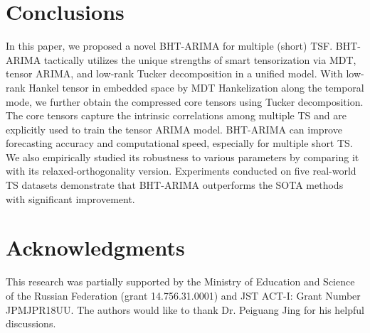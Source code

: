 \documentclass[letterpaper]{article} %
\numberwithin{theorem}{section}
\begin{document}
\section{Conclusions}



In this paper, we  proposed a novel  BHT-ARIMA for multiple (short) TSF. BHT-ARIMA tactically utilizes the unique strengths of  smart tensorization via MDT, tensor ARIMA, and low-rank Tucker 
decomposition in a unified model.  With low-rank Hankel tensor in embedded space by MDT Hankelization along  the temporal mode, we further obtain the compressed core tensors using Tucker decomposition. The core tensors   capture the intrinsic correlations among multiple TS and  are explicitly used to train the  tensor ARIMA model.  BHT-ARIMA   can improve  forecasting accuracy and computational speed, especially for multiple short TS.  We also empirically studied its robustness  to various parameters by comparing it with its relaxed-orthogonality version.  Experiments conducted on five real-world TS datasets demonstrate that  BHT-ARIMA outperforms  the SOTA methods with significant improvement.  

\section*{Acknowledgments}
This  research was partially supported by the Ministry of Education and Science of the Russian Federation (grant 14.756.31.0001) and JST ACT-I: Grant Number JPMJPR18UU. The authors  would like to thank Dr. Peiguang Jing for his helpful discussions. 



\end{document}

